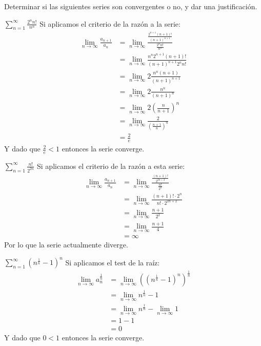 \documentclass[../main.tex]{subfiles}
\begin{document}
Determinar si las siguientes series son convergentes o no, y dar una justificación.

\question $\sum\limits_{n = 1}^\infty \frac{2^n n!}{n^n}$
Si aplicamos el criterio de la razón a la serie:
\begin{align*}
    \lim_{n \to \infty} \frac{a_{n+1}}{a_n} &= \lim_{n \to \infty} \frac{\frac{2^{n+1} (n+1)!}{(n+1)^{n+1}}}{\frac{2^n n!}{n^n}}\\
    &= \lim_{n \to \infty} \frac{n^n 2^{n+1} (n+1)!}{(n+1)^{n+1} 2^n n!}\\
    &= \lim_{n \to \infty} 2\frac{n^n (n+1)}{(n+1)^{n+1}}\\
    &= \lim_{n \to \infty} 2\frac{n^n}{(n+1)^n}\\
    &= \lim_{n \to \infty} 2\left(\frac{n}{n+1}\right)^n\\
    &= \lim_{n \to \infty} \frac{2}{\left(\frac{n+1}{n}\right)^n}\\
    &= \frac{2}{e}
\end{align*}
Y dado que $\frac{2}{e} < 1$ entonces la serie converge.

\question $\sum\limits_{n = 1}^\infty \frac{n!}{2^{2n}}$
Si aplicamos el criterio de la razón a esta serie:
\begin{align*}
    \lim_{n \to \infty} \frac{a_{n+1}}{a_n} &= \lim_{n \to \infty} \frac{\frac{(n+1)!}{2^{2n+2}}}{\frac{n!}{2^n}}\\
    &= \lim_{n \to \infty} \frac{(n+1)! \cdot 2^n}{n! \cdot 2^{2n+2}}\\
    &= \lim_{n \to \infty} \frac{n+1}{2^2}\\
    &= \lim_{n \to \infty} \frac{n+1}{4}\\
    &= \infty
\end{align*}
Por lo que la serie actualmente diverge.

\question $\sum\limits_{n = 1}^\infty \left(n^{\frac{1}{n}} - 1\right)^n$
Si aplicamos el test de la raíz:
\begin{align*}
    \lim_{n \to \infty} a_n^{\frac{1}{n}} &= \lim_{n \to \infty} \left(\left(n^{\frac{1}{n}} - 1\right)^n\right)^{\frac{1}{n}}\\
    &= \lim_{n \to \infty} n^{\frac{1}{n}} - 1\\
    &= \lim_{n \to \infty} n^{\frac{1}{n}} - \lim_{n \to \infty} 1\\
    &= 1 - 1\\
    &= 0
\end{align*}
Y dado que $0 < 1$ entonces la serie converge.
\end{document}
